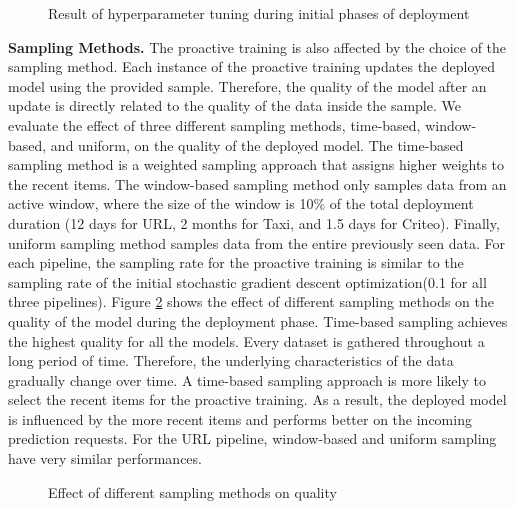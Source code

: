 \begin{figure}[!h]
\centering
\resizebox{\columnwidth}{!}{}
\caption{Result of hyperparameter tuning during initial phases of deployment}
\label{hyper-param-figure}
\end{figure}

\textbf{Sampling Methods.}
The proactive training is also affected by the choice of the sampling method.
Each instance of the proactive training updates the deployed model using the provided sample.
Therefore, the quality of the model after an update is directly related to the quality of the data inside the sample.
We evaluate the effect of three different sampling methods, time-based, window-based, and uniform, on the quality of the deployed model.
The time-based sampling method is a weighted sampling approach that assigns higher weights to the recent items. 
The window-based sampling method only samples data from an active window, where the size of the window is 10\% of the total deployment duration (12 days for URL, 2 months for Taxi, and 1.5 days for Criteo).
Finally, uniform sampling method samples data from the entire previously seen data.
For each pipeline, the sampling rate for the proactive training is similar to the sampling rate of the initial stochastic gradient descent optimization(0.1 for all three pipelines).
Figure \ref{sampling-method-figure} shows the effect of different sampling methods on the quality of the model during the deployment phase.
Time-based sampling achieves the highest quality for all the models.
Every dataset is gathered throughout a long period of time.
Therefore, the underlying characteristics of the data gradually change over time.
A time-based sampling approach is more likely to select the recent items for the proactive training.
As a result, the deployed model is influenced by the more recent items and performs better on the incoming prediction requests.
For the URL pipeline, window-based and uniform sampling have very similar performances.

\begin{figure}[!h]
\centering
\resizebox{\columnwidth}{!}{}
\caption{Effect of different sampling methods on quality}
\label{sampling-method-figure}
\end{figure}

